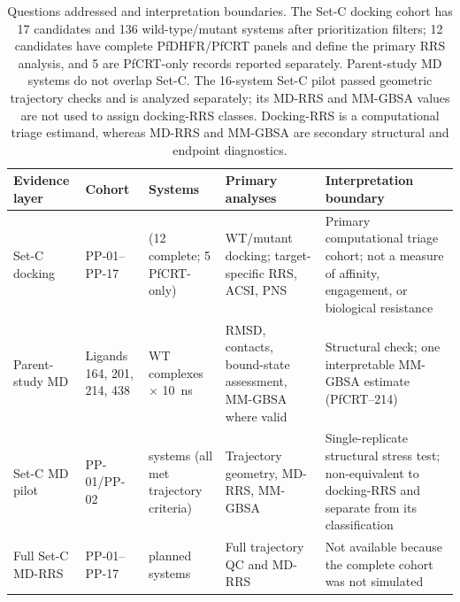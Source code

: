 \begin{table}[htbp]
\centering
\caption{Questions addressed and interpretation boundaries. The Set-C docking cohort has 17 candidates and 136 wild-type/mutant systems after prioritization filters; 12 candidates have complete PfDHFR/PfCRT panels and define the primary RRS analysis, and 5 are PfCRT-only records reported separately. Parent-study MD systems do not overlap Set-C. The 16-system Set-C pilot passed geometric trajectory checks and is analyzed separately; its MD-RRS and MM-GBSA values are not used to assign docking-RRS classes. Docking-RRS is a computational triage estimand, whereas MD-RRS and MM-GBSA are secondary structural and endpoint diagnostics.}
\label{tab:s6_cohort_estimands}
\scriptsize
\begin{tabularx}{\textwidth}{>{\raggedright\arraybackslash}p{} >{\raggedright\arraybackslash}p{} >{\raggedright\arraybackslash}p{} >{\raggedright\arraybackslash}X >{\raggedright\arraybackslash}X}
\toprule
Evidence layer & Cohort & Systems & Primary analyses & Interpretation boundary \\
\midrule
Set-C docking & PP-01--PP-17 & 136 (12 complete; 5 PfCRT-only) & WT/mutant docking; target-specific RRS, ACSI, PNS & Primary computational triage cohort; not a measure of affinity, engagement, or biological resistance \\
Parent-study MD & Ligands 164, 201, 214, 438 & 4 WT complexes $\times$ \qty{10}{\ns} & RMSD, contacts, bound-state assessment, MM-GBSA where valid & Structural check; one interpretable MM-GBSA estimate (PfCRT--214) \\
Set-C MD pilot & PP-01/PP-02 & 16 systems (all met trajectory criteria) & Trajectory geometry, MD-RRS, MM-GBSA & Single-replicate structural stress test; non-equivalent to docking-RRS and separate from its classification \\
Full Set-C MD-RRS & PP-01--PP-17 & 136 planned systems & Full trajectory QC and MD-RRS & Not available because the complete cohort was not simulated \\
\bottomrule
\end{tabularx}
\end{table}
